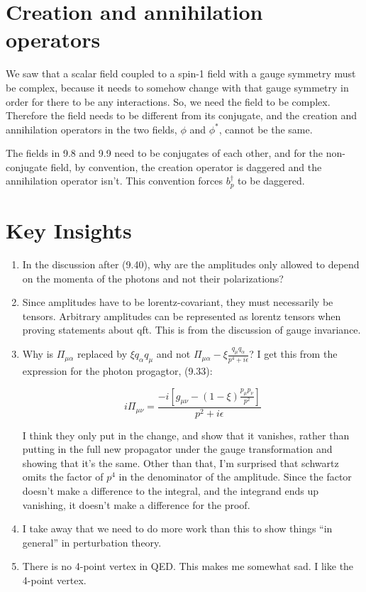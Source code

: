 \documentclass{article}
\begin{document}
\section{Creation and annihilation operators}

We saw that a scalar field coupled to a spin-1 field with a gauge symmetry
	must be complex, because it needs to somehow change with that gauge
	symmetry in order for there to be any interactions.
So, we need the field to be complex.
Therefore the field needs to be different from its conjugate, and the creation
	and annihilation operators in the two fields, $\phi$ and $\phi^*$, cannot
	be the same.

The fields in 9.8 and 9.9 need to be conjugates of each other, and for the non-conjugate
	field, by convention, the creation operator is daggered and the annihilation
	operator isn't.
This convention forces $b_p^\dagger$ to be daggered.

\section{Key Insights}

\begin{enumerate}

\item
In the discussion after (9.40), why are the amplitudes only allowed to depend
	on the momenta of the photons and not their polarizations?

\item
Since amplitudes have to be lorentz-covariant, they must necessarily be 
	tensors.
Arbitrary amplitudes can be represented as lorentz tensors when proving
	statements about qft.
This is from the discussion of gauge invariance.

\item
Why is $\Pi_{\mu \alpha}$ replaced by $\xi q_\alpha q_\mu$ and not
	$\Pi_{\mu \alpha} - \xi \frac{q_\mu q_\alpha}{p^4 + i \epsilon}$?
I get this from the expression for the photon progagtor, (9.33):

\[ i \Pi_{\mu \nu} = \frac{- i \left[ g_{\mu \nu} - (1 - \xi) \frac{p_\mu p_\nu}{p^2} \right]}
	{p^2 + i \epsilon} \]

I think they only put in the change, and show that it vanishes,
	rather than putting in the full new propagator under the gauge transformation
	and showing that it's the same.
Other than that, I'm surprised that schwartz omits the factor of $p^4$ in the denominator
	of the amplitude.
Since the factor doesn't make a difference to the integral, and the integrand
	ends up vanishing, it doesn't make a difference for the proof.

\item
I take away that we need to do more work than this to show things ``in general''
	in perturbation theory.

\item
There is no 4-point vertex in QED.  
This makes me somewhat sad.
I like the 4-point vertex.

\end{enumerate}
\end{document}
